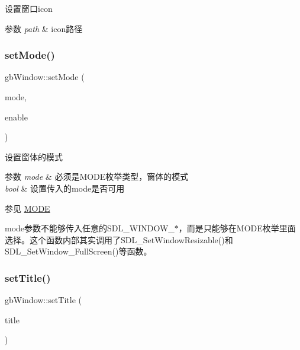 设置窗口icon 


\begin{DoxyParams}{参数}
{\em path} & icon路径 \\
\hline
\end{DoxyParams}
\mbox{\label{classgb_window_abf2068b28248fb4f9ed5d39a5df58d0a}} 
\subsubsection{\texorpdfstring{setMode()}{setMode()}}
{\footnotesize\ttfamily gb\+Window\+::set\+Mode (\begin{DoxyParamCaption}\item[{\mbox{\hyperlink{classgb_window_a19e70d277e17598ddb3c229e28dbb9e9}{M\+O\+DE}}}]{mode,  }\item[{bool}]{enable }\end{DoxyParamCaption})}



设置窗体的模式 


\begin{DoxyParams}{参数}
{\em mode} & 必须是\+M\+O\+D\+E枚举类型，窗体的模式 \\
\hline
{\em bool} & 设置传入的mode是否可用 \\
\hline
\end{DoxyParams}
\begin{DoxySeeAlso}{参见}
\mbox{\hyperlink{classgb_window_a19e70d277e17598ddb3c229e28dbb9e9}{M\+O\+DE}}
\end{DoxySeeAlso}
mode参数不能够传入任意的\+S\+D\+L\+\_\+\+W\+I\+N\+D\+O\+W\+\_\+$\ast$，而是只能够在\+M\+O\+D\+E枚举里面选择。这个函数内部其实调用了\+S\+D\+L\+\_\+\+Set\+Window\+Resizable()和\+S\+D\+L\+\_\+\+Set\+Window\+\_\+\+Full\+Screen()等函数。 \mbox{\label{classgb_window_a17f154d7c86e29d7337fe46cc183c5dc}} 
\subsubsection{\texorpdfstring{setTitle()}{setTitle()}}
{\footnotesize\ttfamily gb\+Window\+::set\+Title (\begin{DoxyParamCaption}\item[{string}]{title }\end{DoxyParamCaption})}



